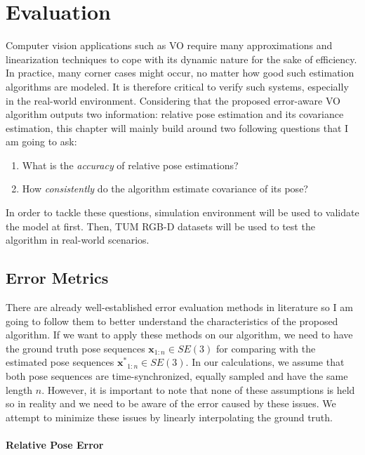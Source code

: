 \documentclass[a4paper]{report}
\numberwithin{figure}{section}
\begin{document}
\chapter{Evaluation} \label{cp_evaluation}

Computer vision applications such as VO require many approximations and 
linearization techniques to cope with its dynamic nature for the sake of 
efficiency.  In practice, many corner cases might occur, no matter how good 
such estimation algorithms are modeled. It is therefore critical to verify 
such systems, especially in the real-world environment.  Considering that the 
proposed error-aware VO algorithm outputs two information: relative pose 
estimation and its covariance estimation, this chapter will mainly build 
around two following questions that I am going to ask:

\begin{enumerate} \item What is the \textit{accuracy} of relative pose 
estimations?  \item How \textit{consistently} do the algorithm estimate 
covariance of its pose?  \end{enumerate}

In order to tackle these questions, simulation environment will be used to validate the model at first. Then, TUM RGB-D datasets will be used to test the algorithm in real-world scenarios.

\section{Error Metrics}

There are already well-established error evaluation methods in literature so I am going to follow them to better understand the characteristics of the proposed algorithm.  If we want to apply these methods on our algorithm, we need to have the ground truth pose sequences $\mathbf{x}_{1:n} \in SE(3)$ for comparing with the estimated pose sequences $\mathbf{x^*}_{1:n} \in SE(3)$.  In our calculations, we assume that both pose sequences are time-synchronized, equally sampled and have the same length $n$.  However, it is important to note that none of these assumptions is held so in reality and we need to be aware of the error caused by these issues.  We attempt to minimize these issues by linearly interpolating the ground truth.


\subsubsection{Relative Pose Error}
\end{document}
